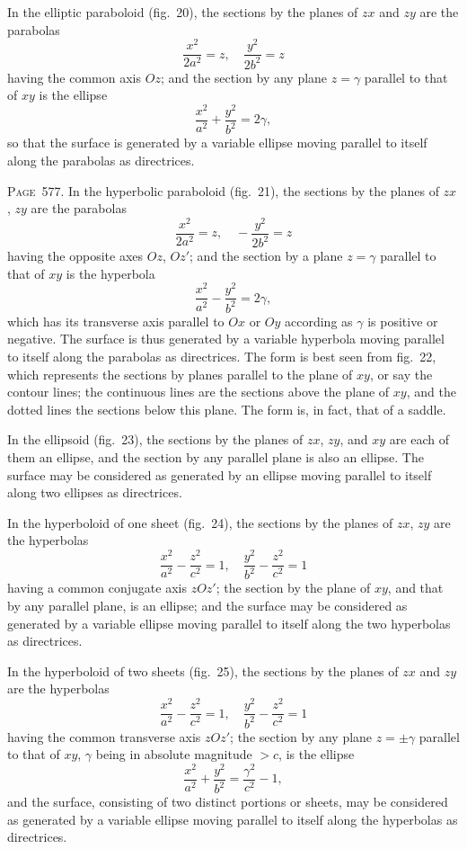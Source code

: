 \documentclass[11pt,a4paper]{article}
\theoremstyle{definition}
\begin{document}
In the elliptic paraboloid (fig.~20), the sections by the planes of $zx$ and $zy$ are the parabolas
\[
\frac{x^2}{2a^2}=z,\quad \frac{y^2}{2b^2}=z
\]
having the common axis $Oz$; and the section by any plane $z=\gamma$ parallel to that of $xy$ is the ellipse
\[
\frac{x^2}{a^2}+\frac{y^2}{b^2}=2\gamma,
\]
so that the surface is generated by a variable ellipse moving parallel to itself along the parabolas as directrices.

\newpage
\noindent\textsc{Page~577.} In the hyperbolic paraboloid (fig.~21), the sections by the planes of $zx$, $zy$ are the parabolas
\[
\frac{x^2}{2a^2}=z,\quad -\frac{y^2}{2b^2}=z
\]
having the opposite axes $Oz$, $Oz'$; and the section by a plane $z=\gamma$ parallel to that of $xy$ is the hyperbola
\[
\frac{x^2}{a^2}-\frac{y^2}{b^2}=2\gamma,
\]
which has its transverse axis parallel to $Ox$ or $Oy$ according as $\gamma$ is positive or negative. The surface is thus generated by a variable hyperbola moving parallel to itself along the parabolas as directrices. The form is best seen from fig.~22, which represents the sections by planes parallel to the plane of $xy$, or say the contour lines; the continuous lines are the sections above the plane of $xy$, and the dotted lines the sections below this plane. The form is, in fact, that of a saddle.

In the ellipsoid (fig.~23), the sections by the planes of $zx$, $zy$, and $xy$ are each of them an ellipse, and the section by any parallel plane is also an ellipse. The surface may be considered as generated by an ellipse moving parallel to itself along two ellipses as directrices.

In the hyperboloid of one sheet (fig.~24), the sections by the planes of $zx$, $zy$ are the hyperbolas
\[
\frac{x^2}{a^2}-\frac{z^2}{c^2}=1,\quad \frac{y^2}{b^2}-\frac{z^2}{c^2}=1
\]
having a common conjugate axis $zOz'$; the section by the plane of $xy$, and that by any parallel plane, is an ellipse; and the surface may be considered as generated by a variable ellipse moving parallel to itself along the two hyperbolas as directrices.

In the hyperboloid of two sheets (fig.~25), the sections by the planes of $zx$ and $zy$ are the hyperbolas
\[
\frac{x^2}{a^2}-\frac{z^2}{c^2}=1,\quad \frac{y^2}{b^2}-\frac{z^2}{c^2}=1
\]
having the common transverse axis $zOz'$; the section by any plane $z=\pm\gamma$ parallel to that of $xy$, $\gamma$ being in absolute magnitude $>c$, is the ellipse
\[
\frac{x^2}{a^2}+\frac{y^2}{b^2}=\frac{\gamma^2}{c^2}-1,
\]
and the surface, consisting of two distinct portions or sheets, may be considered as generated by a variable ellipse moving parallel to itself along the hyperbolas as directrices.
\end{document}
